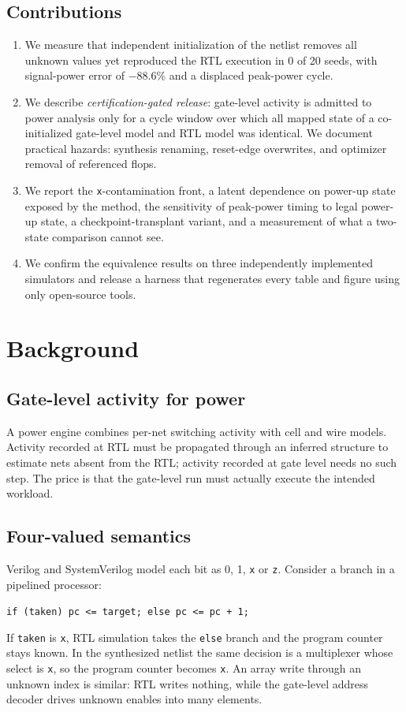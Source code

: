 \documentclass[journal]{IEEEtran}
\newcommand{\X}{\texttt{x}}
\begin{document}
\subsection{Contributions}
\begin{enumerate}
\item We measure that independent initialization of the netlist removes all
      unknown values yet reproduced the RTL execution in 0 of 20 seeds, with
      signal-power error of $-88.6\%$ and a displaced peak-power cycle.
\item We describe \emph{certification-gated release}: gate-level activity is
      admitted to power analysis only for a cycle window over which all mapped
      state of a co-initialized gate-level model and RTL model was identical.
      We document practical hazards: synthesis renaming, reset-edge overwrites,
      and optimizer removal of referenced flops.
\item We report the \X-contamination front, a latent dependence on power-up
      state exposed by the method, the sensitivity of peak-power timing to legal
      power-up state, a checkpoint-transplant variant, and a measurement of what
      a two-state comparison cannot see.
\item We confirm the equivalence results on three independently implemented
      simulators and release a harness that regenerates every table and figure
      using only open-source tools.
\end{enumerate}

\section{Background}

\subsection{Gate-level activity for power}
A power engine combines per-net switching activity with cell and wire models.
Activity recorded at RTL must be propagated through an inferred structure to
estimate nets absent from the RTL; activity recorded at gate level needs no such
step. The price is that the gate-level run must actually execute the intended
workload.

\subsection{Four-valued semantics}
Verilog and SystemVerilog model each bit as 0, 1, \X{} or \texttt{z}. Consider a
branch in a pipelined processor:
\begin{center}\small
\texttt{if (taken) pc <= target; else pc <= pc + 1;}
\end{center}
If \texttt{taken} is \X, RTL simulation takes the \texttt{else} branch and the
program counter stays known. In the synthesized netlist the same decision is a
multiplexer whose select is \X, so the program counter becomes \X. An array write
through an unknown index is similar: RTL writes nothing, while the gate-level
address decoder drives unknown enables into many elements.
\end{document}
